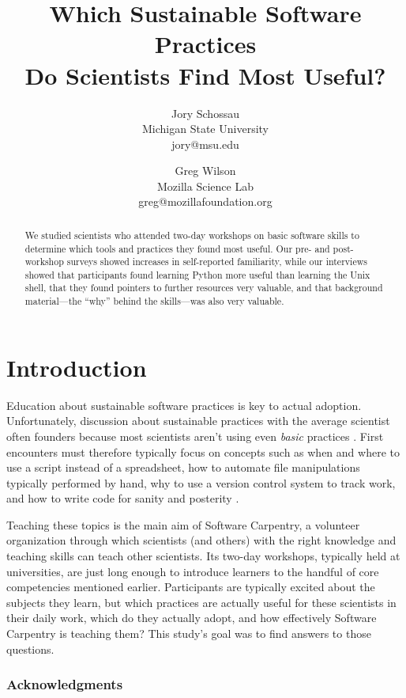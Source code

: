 \documentclass[10pt, twocolumn]{article}
\title{Which Sustainable Software Practices\\ Do Scientists Find Most Useful?}
\author{
	Jory Schossau \\
	\small{Michigan State University} \\
	\small{jory@msu.edu}
	\and
	Greg Wilson \\
	\small{Mozilla Science Lab} \\
	\small{greg@mozillafoundation.org}
}
\begin{document}
\maketitle

\begin{abstract}
We studied scientists who attended two-day workshops on basic software skills
to determine which tools and practices they found most useful.
Our pre- and post-workshop surveys showed increases in self-reported familiarity,
while our interviews showed that participants found learning Python more useful than learning the Unix shell,
that they found pointers to further resources very valuable,
and that background material---the ``why'' behind the skills---was also very valuable.
\end{abstract}

\section{Introduction}

Education about sustainable software practices
is key to actual adoption.
Unfortunately,
discussion about sustainable practices with the average scientist often founders
because most scientists aren't using even \emph{basic} practices \cite{b:hannay2009,b:prabhu2011}.
First encounters must therefore typically focus on concepts such as
when and where to use a script instead of a spreadsheet,
how to automate file manipulations typically performed by hand,
why to use a version control system to track work,
and how to write code for sanity and posterity \cite{b:wilson2013}.

Teaching these topics is the main aim of Software Carpentry,
a volunteer organization through which scientists (and others)
with the right knowledge and teaching skills can teach other scientists.
Its two-day workshops,
typically held at universities,
are just long enough to introduce learners to the handful of core competencies mentioned earlier.
Participants are typically excited about the subjects they learn,
but which practices are actually useful for these scientists in their daily work,
which do they actually adopt,
and how effectively Software Carpentry is teaching them?
This study's goal was to find answers to those questions.

\subsubsection*{Acknowledgments}
\end{document}
